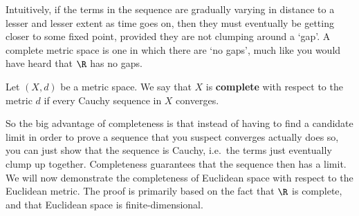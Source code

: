 Intuitively, if the terms in the sequence are gradually varying in distance to a lesser and lesser extent as time goes on, then they must eventually be getting closer to some fixed point, provided they are not clumping around a `gap'. A complete metric space is one in which there are `no gaps', much like you would have heard that \( \R \) has no gaps.

\begin{definition}
  Let \( (X,d) \) be a metric space. We say that \( X \) is \textbf{complete} with respect to the metric \( d \) if every Cauchy sequence in \( X \) converges.
\end{definition}

So the big advantage of completeness is that instead of having to find a candidate limit in order to prove a sequence that you suspect converges actually does so, you can just show that the sequence is Cauchy, i.e.\ the terms just eventually clump up together. Completeness guarantees that the sequence then has a limit. We will now demonstrate the completeness of Euclidean space with respect to the Euclidean metric. The proof is primarily based on the fact that \( \R \) is complete, and that Euclidean space is finite-dimensional.

